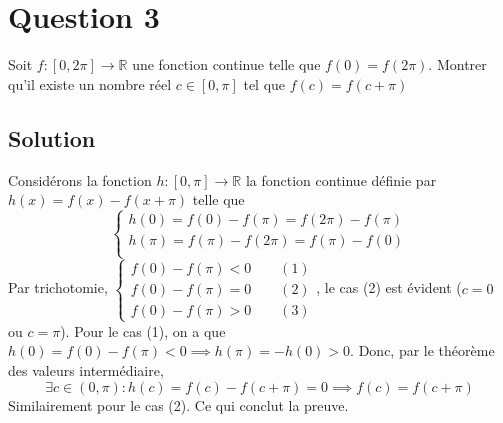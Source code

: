 \section*{Question 3}
	Soit $f:[0,2\pi]\longrightarrow\mathbb{R}$ une fonction continue telle que $f(0)=f(2\pi)$. Montrer qu'il existe un nombre réel $c\in [0,\pi]$ tel que $f(c)=f(c+\pi)$
\subsection*{Solution}
	Considérons la fonction $h:[0,\pi]\longrightarrow\mathbb{R}$ la fonction continue définie par $h(x)=f(x)-f(x+\pi)$ telle que
	\[\begin{cases}
		h(0)=f(0)-f(\pi)=f(2\pi)-f(\pi)\\
		h(\pi)=f(\pi)-f(2\pi)=f(\pi)-f(0)\\
	\end{cases}\]
	Par trichotomie, $\begin{cases}
	f(0)-f(\pi)<0\qquad (1)\\
	f(0)-f(\pi)=0\qquad (2)\\
	f(0)-f(\pi)>0\qquad (3)
	\end{cases}$, le cas (2) est évident ($c=0$ ou $c=\pi$). Pour le cas (1), on a que $h(0)=f(0)-f(\pi)<0\implies h(\pi)=-h(0)>0$. Donc, par le théorème des valeurs intermédiaire, 
	\[\exists c\in (0,\pi) : h(c)=f(c)-f(c+\pi)=0\implies f(c)=f(c+\pi)\] 
	Similairement pour le cas (2). Ce qui conclut la preuve.